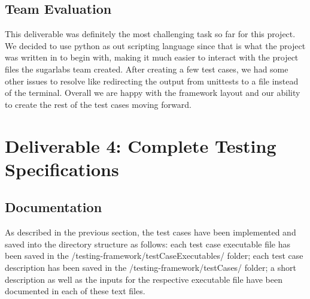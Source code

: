 \documentclass{article}
\begin{document}
\subsection{Team Evaluation}
This deliverable was definitely the most challenging task so far for this project. We decided to use python as out scripting language since that is what the project was written in to begin with, making it much easier to interact with the project files the sugarlabs team created. After creating a few test cases, we had some other issues to resolve like redirecting the output from unittests to a file instead of the terminal. Overall we are happy with the framework layout and our ability to create the rest of the test cases moving forward. 

\section{Deliverable 4: Complete Testing Specifications}
\subsection{Documentation}
As described in the previous section, the test cases have been implemented and saved into the directory structure as follows: each test case executable file has been saved in the /testing-framework/testCaseExecutables/ folder; each test case description has been saved in the /testing-framework/testCases/ folder; a short description as well as the inputs for the respective executable file have been documented in each of these text files.
\end{document}
